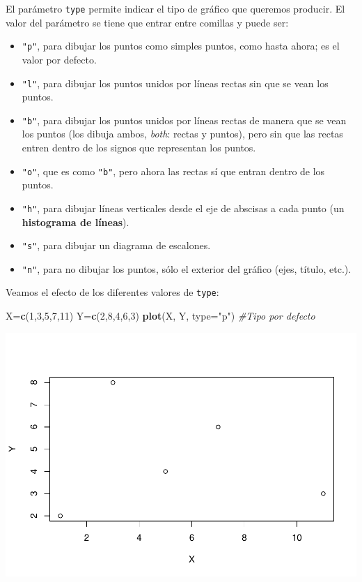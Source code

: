 \documentclass[
]{book}
\newenvironment{Shaded}{\begin{snugshade}}{\end{snugshade}}
\newcommand{\CommentTok}[1]{\textcolor[rgb]{0.56,0.35,0.01}{\textit{#1}}}
\newcommand{\DataTypeTok}[1]{\textcolor[rgb]{0.13,0.29,0.53}{#1}}
\newcommand{\DecValTok}[1]{\textcolor[rgb]{0.00,0.00,0.81}{#1}}
\newcommand{\KeywordTok}[1]{\textcolor[rgb]{0.13,0.29,0.53}{\textbf{#1}}}
\newcommand{\NormalTok}[1]{#1}
\newcommand{\StringTok}[1]{\textcolor[rgb]{0.31,0.60,0.02}{#1}}
\providecommand{\tightlist}{%
  \setlength{\itemsep}{0pt}\setlength{\parskip}{0pt}}
\theoremstyle{definition}
\theoremstyle{definition}
\theoremstyle{definition}
\theoremstyle{remark}
\begin{document}
El parámetro \texttt{type} permite indicar el tipo de gráfico que queremos producir. El valor del parámetro se tiene que entrar entre comillas y puede ser:

\begin{itemize}
\tightlist
\item
  \texttt{"p"}, para dibujar los puntos como simples puntos, como hasta ahora; es el valor por defecto.
\item
  \texttt{"l"}, para dibujar los puntos unidos por líneas rectas sin que se vean los puntos.
\item
  \texttt{"b"}, para dibujar los puntos unidos por líneas rectas de manera que se vean los puntos (los dibuja ambos, \emph{both}: rectas y puntos), pero sin que las rectas entren dentro de los signos que representan los puntos.
\item
  \texttt{"o"}, que es como \texttt{"b"}, pero ahora las rectas sí que entran dentro de los puntos.
\item
  \texttt{"h"}, para dibujar líneas verticales desde el eje de abscisas a cada punto (un \textbf{histograma de líneas}).
\item
  \texttt{"s"}, para dibujar un diagrama de escalones.
\item
  \texttt{"n"}, para no dibujar los puntos, sólo el exterior del gráfico (ejes, título, etc.).
\end{itemize}

Veamos el efecto de los diferentes valores de \texttt{type}:

\begin{Shaded}
\begin{Highlighting}[]
\NormalTok{X=}\KeywordTok{c}\NormalTok{(}\DecValTok{1}\NormalTok{,}\DecValTok{3}\NormalTok{,}\DecValTok{5}\NormalTok{,}\DecValTok{7}\NormalTok{,}\DecValTok{11}\NormalTok{)}
\NormalTok{Y=}\KeywordTok{c}\NormalTok{(}\DecValTok{2}\NormalTok{,}\DecValTok{8}\NormalTok{,}\DecValTok{4}\NormalTok{,}\DecValTok{6}\NormalTok{,}\DecValTok{3}\NormalTok{)}
\KeywordTok{plot}\NormalTok{(X, Y, }\DataTypeTok{type=}\StringTok{"p"}\NormalTok{)  }\CommentTok{\#Tipo por defecto}
\end{Highlighting}
\end{Shaded}

\begin{center}\includegraphics[width=0.9\linewidth]{07chap06_Graficos_I_files/figure-latex/unnamed-chunk-5-1} \end{center}
\end{document}
